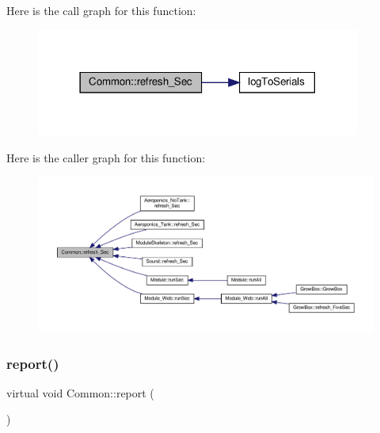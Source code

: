 Here is the call graph for this function\+:
\nopagebreak
\begin{figure}[H]
\begin{center}
\leavevmode
\includegraphics[width=302pt]{class_common_acd1fdd47fbf8bb490f5c6d3ab6cd8d05_cgraph}
\end{center}
\end{figure}
Here is the caller graph for this function\+:
\nopagebreak
\begin{figure}[H]
\begin{center}
\leavevmode
\includegraphics[width=350pt]{class_common_acd1fdd47fbf8bb490f5c6d3ab6cd8d05_icgraph}
\end{center}
\end{figure}
\mbox{\label{class_common_a3fccb7776a84e0faf4a7f5a3af615b36}} 
\subsubsection{\texorpdfstring{report()}{report()}\hspace{0.1cm}{\footnotesize\ttfamily [1/2]}}
{\footnotesize\ttfamily virtual void Common\+::report (\begin{DoxyParamCaption}{ }\end{DoxyParamCaption})\hspace{0.3cm}{\ttfamily [virtual]}}



